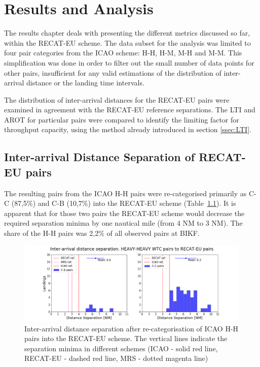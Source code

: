 \chapter{Results and Analysis\label{cha:results_analysis}}

The results chapter deals with presenting the different metrics discussed so far, within the RECAT-EU scheme. The data subset for the analysis was limited to four pair categories from the ICAO scheme: H-H, H-M, M-H and M-M. This simplification was done in order to filter out the small number of data points for other pairs, insufficient for any valid estimations of the distribution of inter-arrival distance or the landing time intervals. 

The distribution of inter-arrival distances for the RECAT-EU pairs were examined in agreement with the RECAT-EU reference separations. The LTI and AROT for particular pairs were compared to identify the limiting factor for throughput capacity, using the method already introduced in section \ref{ssec:LTI}.

\section{Inter-arrival Distance Separation of RECAT-EU pairs}\label{sec:interarrival_dist_sep_RECAT}
The resulting pairs from the ICAO H-H pairs were re-categorised primarily as C-C (87,5\%) and C-B (10,7\%) into the RECAT-EU scheme (Table~\ref{fig:HH_to_RECAT_pairs_dist_separ}). It is apparent that for those two pairs the RECAT-EU scheme would decrease the required separation minima by one nautical mile (from 4 NM to 3 NM). The share of the H-H pairs was 2,2\% of all observed pairs at BIKF.

\begin{figure}[h]
    \centering
    \includegraphics[width=1\textwidth]{graphics/fig_HH_to_RECAT_pairs_dist_separ.png}
    \caption[Inter-arrival distance separation of ICAO H-H pairs into the RECAT-EU scheme]{Inter-arrival distance separation after re-categorisation of ICAO H-H pairs into the RECAT-EU scheme. The vertical lines indicate the separation minima in different schemes (ICAO - solid red line, RECAT-EU - dashed red line, MRS - dotted magenta line)}
    \label{fig:HH_to_RECAT_pairs_dist_separ}
\end{figure}

